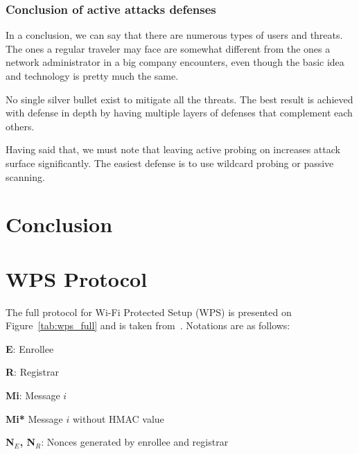 \documentclass[12pt,a4paper,oneside,pdftex]{report}
\begin{document}
\subsection{Conclusion of active attacks defenses}

In a conclusion, we can say that there are numerous types of users and threats. The ones a regular traveler may face are somewhat different from the ones a network administrator in a big company encounters, even though the basic idea and technology is pretty much the same.

No single silver bullet exist to mitigate all the threats. The best result is achieved with defense in depth by having multiple layers of defenses that complement each others.

Having said that, we must note that leaving active probing on increases attack surface significantly. The easiest defense is to use wildcard probing or passive scanning.




\chapter{Conclusion}
\label{chapter:conclusion}


% 



\appendix
\chapter{WPS Protocol}
\label{chapter:appendix:wps}

The full protocol for Wi-Fi Protected Setup (WPS) is presented on Figure~\ref{tab:wps_full} and is taken from~\cite{microsoftWCN}. Notations are as follows:

\textbf{E}: Enrollee

\textbf{R}: Registrar

\textbf{Mi}: Message $i$

\textbf{Mi*} Message $i$ without HMAC value

\textbf{N$_E$, N$_R$}: Nonces generated by enrollee and registrar
\end{document}
